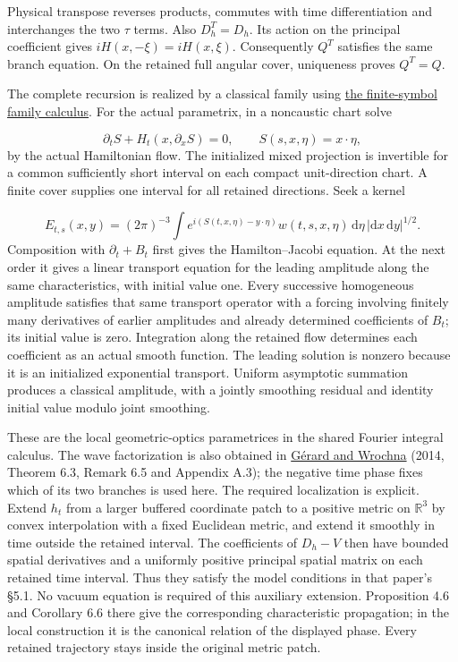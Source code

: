 \documentclass[
  english,
  11pt,
  reqno]{amsart}
\begin{document}
Physical transpose reverses products, commutes with time differentiation
and interchanges the two \(\tau\) terms. Also \(D_h^T=D_h\). Its action
on the principal coefficient gives \(iH(x,-\xi)=iH(x,\xi)\).
Consequently \(Q^T\) satisfies the same branch equation. On the retained
full angular cover, uniqueness proves \(Q^T=Q\).

The complete recursion is realized by a classical family using
\hyperref[lem:online-finite-symbol-family-calculus]{the finite-symbol
family calculus}. For the actual parametrix, in a noncaustic chart solve

\label{eq:online-wave-positive-phase} \[
\partial_tS+H_t(x,\partial_xS)=0,
\qquad S(s,x,\eta)=x\cdot\eta,
\] by the actual Hamiltonian flow. The initialized mixed projection is
invertible for a common sufficiently short interval on each compact
unit-direction chart. A finite cover supplies one interval for all
retained directions. Seek a kernel

\label{eq:online-wave-positive-fio-kernel} \[
E_{t,s}(x,y)
=(2\pi)^{-3}\int
e^{i(S(t,x,\eta)-y\cdot\eta)}
w(t,s,x,\eta)\,\mathrm d\eta\,
|\mathrm dx\,\mathrm dy|^{1/2}.
\] Composition with \(\partial_t+B_t\) first gives the Hamilton--Jacobi
equation. At the next order it gives a linear transport equation for the
leading amplitude along the same characteristics, with initial value
one. Every successive homogeneous amplitude satisfies that same
transport operator with a forcing involving finitely many derivatives of
earlier amplitudes and already determined coefficients of \(B_t\); its
initial value is zero. Integration along the retained flow determines
each coefficient as an actual smooth function. The leading solution is
nonzero because it is an initialized exponential transport. Uniform
asymptotic summation produces a classical amplitude, with a jointly
smoothing residual and identity initial value modulo joint smoothing.

These are the local geometric-optics parametrices in the shared Fourier
integral calculus. The wave factorization is also obtained in
\hyperref[ref-gerard-wrochna2014]{Gérard and Wrochna} (2014, Theorem
6.3, Remark 6.5 and Appendix A.3); the negative time phase fixes which
of its two branches is used here. The required localization is explicit.
Extend \(h_t\) from a larger buffered coordinate patch to a positive
metric on \(\mathbb R^3\) by convex interpolation with a fixed Euclidean
metric, and extend it smoothly in time outside the retained interval.
The coefficients of \(D_h-V\) then have bounded spatial derivatives and
a uniformly positive principal spatial matrix on each retained time
interval. Thus they satisfy the model conditions in that paper's §5.1.
No vacuum equation is required of this auxiliary extension. Proposition
4.6 and Corollary 6.6 there give the corresponding characteristic
propagation; in the local construction it is the canonical relation of
the displayed phase. Every retained trajectory stays inside the original
metric patch.
\end{document}
